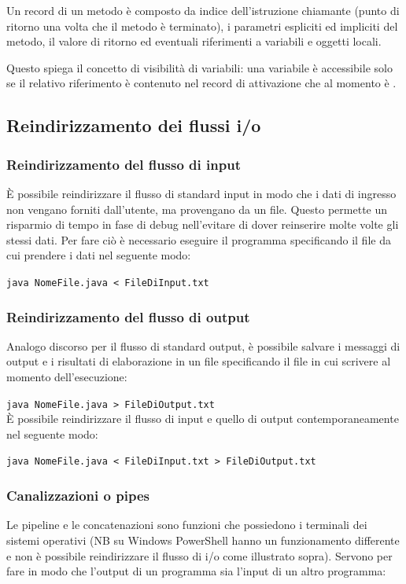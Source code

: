 \documentclass[a4paper]{article}
\begin{document}
Un record di un metodo è composto da indice dell'istruzione chiamante (punto di ritorno una volta che il metodo è terminato),
i parametri espliciti ed impliciti del metodo, il valore di ritorno ed eventuali riferimenti a variabili e oggetti locali.

Questo spiega il concetto di visibilità di variabili: una variabile è accessibile solo se il relativo riferimento è contenuto nel
record di attivazione che al momento è .

\subsection{Reindirizzamento dei flussi i/o}
\subsubsection*{Reindirizzamento del flusso di input}
È possibile reindirizzare il flusso di standard input in modo che i dati di ingresso non vengano forniti dall'utente, ma provengano
da un file. Questo permette un risparmio di tempo in fase di debug nell'evitare di dover reinserire molte volte gli stessi dati.
Per fare ciò è necessario eseguire il programma specificando il file da cui prendere i dati nel seguente modo:

\verb|java NomeFile.java < FileDiInput.txt|

\subsubsection*{Reindirizzamento del flusso di output}
Analogo discorso per il flusso di standard output, è possibile salvare i messaggi di output e i risultati di elaborazione in un file
specificando il file in cui scrivere al momento dell'esecuzione:

\verb|java NomeFile.java > FileDiOutput.txt|
\\
È possibile reindirizzare il flusso di input e quello di output contemporaneamente nel seguente modo:

\verb|java NomeFile.java < FileDiInput.txt > FileDiOutput.txt|


\subsubsection*{Canalizzazioni o pipes}
Le pipeline e le concatenazioni sono funzioni che possiedono i terminali dei sistemi operativi (NB su Windows PowerShell hanno un funzionamento
differente e non è possibile reindirizzare il flusso di i/o come illustrato sopra). Servono per fare in modo che l'output di un programma sia 
l'input di un altro programma:
\end{document}
